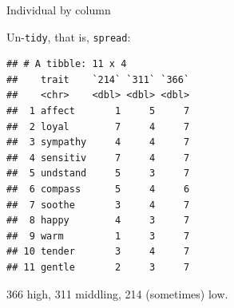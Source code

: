 \documentclass[
  ignorenonframetext,
]{beamer}
\newenvironment{Shaded}{\begin{snugshade}}{\end{snugshade}}
\newcommand{\DataTypeTok}[1]{\textcolor[rgb]{0.13,0.29,0.53}{#1}}
\newcommand{\DecValTok}[1]{\textcolor[rgb]{0.00,0.00,0.81}{#1}}
\newcommand{\FloatTok}[1]{\textcolor[rgb]{0.00,0.00,0.81}{#1}}
\newcommand{\KeywordTok}[1]{\textcolor[rgb]{0.13,0.29,0.53}{\textbf{#1}}}
\newcommand{\NormalTok}[1]{#1}
\newcommand{\OperatorTok}[1]{\textcolor[rgb]{0.81,0.36,0.00}{\textbf{#1}}}
\newcommand{\StringTok}[1]{\textcolor[rgb]{0.31,0.60,0.02}{#1}}
\begin{document}
\begin{frame}[fragile]{Individual by column}
\protect\hypertarget{individual-by-column}{}

Un-\texttt{tidy}, that is, \texttt{spread}:

\tiny

\begin{Shaded}
\end{Shaded}

\begin{verbatim}
## # A tibble: 11 x 4
##    trait    `214` `311` `366`
##    <chr>    <dbl> <dbl> <dbl>
##  1 affect       1     5     7
##  2 loyal        7     4     7
##  3 sympathy     4     4     7
##  4 sensitiv     7     4     7
##  5 undstand     5     3     7
##  6 compass      5     4     6
##  7 soothe       3     4     7
##  8 happy        4     3     7
##  9 warm         1     3     7
## 10 tender       3     4     7
## 11 gentle       2     3     7
\end{verbatim}

\normalsize

366 high, 311 middling, 214 (sometimes) low.

\end{frame}
\end{document}
